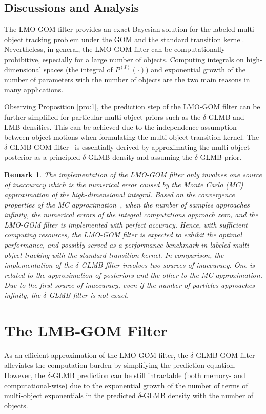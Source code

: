 \documentclass[journal]{IEEEtran}
\newtheorem{Rem}{Remark}
\begin{document}
{\subsection{Discussions and Analysis}
The LMO-GOM filter provides an exact Bayesian solution for the labeled multi-object tracking problem under the GOM and the standard transition kernel. Nevertheless, in general, the LMO-GOM filter can be computationally prohibitive, especially for a large number of objects. Computing integrals on high-dimensional spaces (the integral of $P^{(I)}(\cdot)$) and exponential growth of the number of parameters with the number of objects are the two main reasons
in many applications. 

Observing  Proposition \ref{pro:1}, the   prediction step of the LMO-GOM filter can be further simplified for particular multi-object priors such as the $\delta$-GLMB and LMB densities. 
This can be achieved due to the independence assumption between object motions when formulating the multi-object transition kernel. The $\delta$-GLMB-GOM  filter~\cite{refr:label_6} is essentially derived  by approximating the multi-object posterior as a principled $\delta$-GLMB density and assuming the $\delta$-GLMB prior. 
\begin{Rem}\label{remark:3}
The implementation of the LMO-GOM  filter only involves  one source of inaccuracy which is the numerical error caused by the Monte Carlo (MC) approximation of the high-dimensional integral. 
Based on the convergence properties of the MC approximation~\cite{refr:convergence_partical}, when the number of samples approaches infinity, the numerical errors of the integral computations approach zero, and the LMO-GOM filter is implemented with perfect accuracy.  Hence, with sufficient computing resources, the LMO-GOM filter is expected to exhibit the optimal performance, and 
possibly served as a performance benchmark in labeled multi-object tracking with the standard transition kernel. 
In comparison,  the implementation of the $\delta$-GLMB filter involves two sources of inaccuracy. One is related to the approximation of posteriors and the other to the MC approximation.   Due to the first source of inaccuracy, even if the number of particles approaches infinity, the $\delta$-GLMB filter is not exact.
\end{Rem}


\section{The LMB-GOM Filter}\label{chp:5}
As an efficient approximation of the LMO-GOM filter,  the $\delta$-GLMB-GOM filter  alleviates the computation burden by simplifying the prediction equation. However, the $\delta$-GLMB prediction can be still intractable (both memory- and computational-wise) due to the exponential growth of the number of  terms of multi-object exponentials in the predicted $\delta$-GLMB density  with the number of objects.

}
\end{document}
